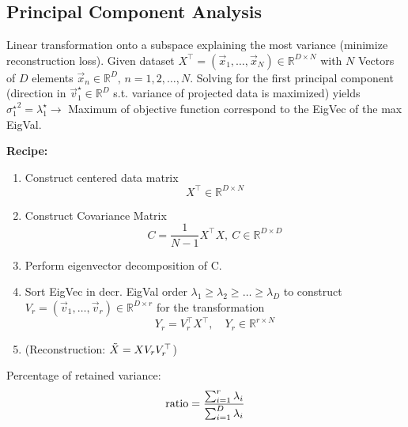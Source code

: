 \subsection{Principal Component Analysis}
    Linear transformation onto a subspace explaining the most variance (minimize reconstruction loss). Given dataset $X^\top = (\Vec{x}_1,\dots,\Vec{x}_N)\in\mathbb{R}^{D\times N}$ with $N$ Vectors of $D$ elements $\Vec{x}_n\in\mathbb{R}^D,\, n = 1,2,\dots,N$. %
    Solving for the first principal component (direction in $\Vec{v}_1^\star\in\mathbb{R}^D$ s.t. variance of projected data is maximized) yields ${\sigma_1^\star}^2 = \lambda_1^\star \rightarrow$ Maximum of objective function correspond to the EigVec of the max EigVal.
    
    \textbf{Recipe:}
    \begin{enumerate}
        \item Construct centered data matrix
            \begin{equation*}
                X^\top\in\mathbb{R}^{D\times N}
            \end{equation*}
            
        \item Construct Covariance Matrix 
            \begin{equation*}
                C = \frac{1}{N-1}X^\top X,\ C\in\mathbb{R}^{D\times D}
            \end{equation*}
        
        \item Perform eigenvector decomposition of C.
        \item Sort EigVec in decr. EigVal order $\lambda_1\geq\lambda_2\geq\dots\geq\lambda_D$ to construct $V_r = (\Vec{v}_1,\dots,\Vec{v}_r)\in\mathbb{R}^{D\times r}$ for the transformation 
        \begin{equation*}
        Y_r = V_r^\top X^\top, \quad Y_r \in\mathbb{R}^{r\times N}
        \end{equation*}
        
        \item \Big(Reconstruction: $\Tilde{X} = X V_r V_r^\top$\Big)
        
    \end{enumerate}
    
    Percentage of retained variance:
    \begin{equation*}
        \textnormal{ratio} = \frac{\sum_{i=1}^r \lambda_i}{\sum_{i=1}^D \lambda_i}
    \end{equation*}
